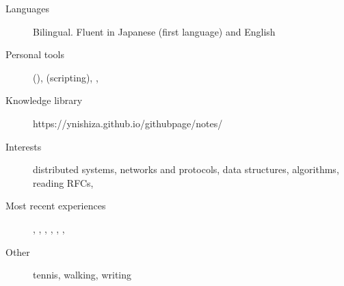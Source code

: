 \begin{description}
  \liststyle
  \item[Languages]{Bilingual. Fluent in Japanese (first language) and English}
  \item[Personal tools]{\rfneovim (\rfvim), \rfbash (scripting), \rfgit, \rftmux }
  \item[Knowledge library]{https://ynishiza.github.io/githubpage/notes/}
  \item[Interests]{distributed systems, networks and protocols, data structures, algorithms, reading RFCs, \rfhaskell }
  \item[Most recent experiences]{\rfnodejs, \rfmongodb, \rfredis, \rfneofj, \rfdocker, \rfreact, \rfcypress  }
  \item[Other]{tennis, walking, writing}
\end{description}

